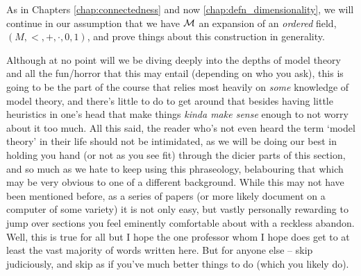 

\begin{svgraybox}
  As in Chapters \ref{chap:connectedness} and now \ref{chap:defn_dimensionality}, we will continue in our assumption that we have $\mathcal{M}$ an \om expansion of an \emph{ordered} field, $(M, <, +, \cdot, 0, 1)$, and prove things about this construction in generality.
\end{svgraybox}

Although at no point will we be diving deeply into the depths of model theory and all the fun/horror that this may entail (depending on who you ask), this is going to be the part of the course that relies most heavily on \emph{some} knowledge of model theory, and there's little to do to get around that besides having little heuristics in one's head that make things \emph{kinda make sense} enough to not worry about it too much. All this said, the reader who's not even heard the term `model theory' in their life should not be intimidated, as we will be doing our best in holding you hand (or not as you see fit) through the dicier parts of this section, and so much as we hate to keep using this phraseology, belabouring that which may be very obvious to one of a different background. While this may not have been mentioned before, as a series of papers (or more likely document on a computer of some variety) it is not only easy, but vastly personally rewarding to jump over sections you feel eminently comfortable about with a reckless abandon. Well, this is true for all but I hope the one professor whom I hope does get to at least the vast majority of words written here. But for anyone else -- skip judiciously, and skip as if you've much better things to do (which you likely do).

